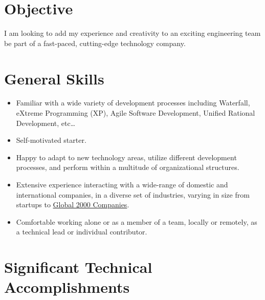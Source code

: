 \documentclass[11pt]{article}
\title{}
\author{Neil Smithline}
\date{\today}
\begin{document}
\begin{center}


\end{center}

\section*{Objective}
\label{sec-1}

I am looking to add my experience and creativity to an exciting engineering team be part of a fast-paced, cutting-edge technology company.
\section*{General Skills}
\label{sec-2}

\begin{itemize}
\item Familiar with a wide variety of development processes including Waterfall, eXtreme Programming (XP), Agile Software Development, Unified Rational Development, etc\ldots{}
\item Self-motivated starter.
\item Happy to adapt to new technology areas, utilize different development processes, and perform within a multitude of organizational structures.
\item Extensive experience interacting with a wide-range of domestic and international companies, in a diverse set of industries, varying in size from startups to \href{http://www.forbes.com/global2000/list/}{Global 2000 Companies}.
\item Comfortable working alone or as a member of a team, locally or remotely, as a technical lead or individual contributor.
\end{itemize}
\section*{Significant Technical Accomplishments}
\label{sec-3}
\end{document}
